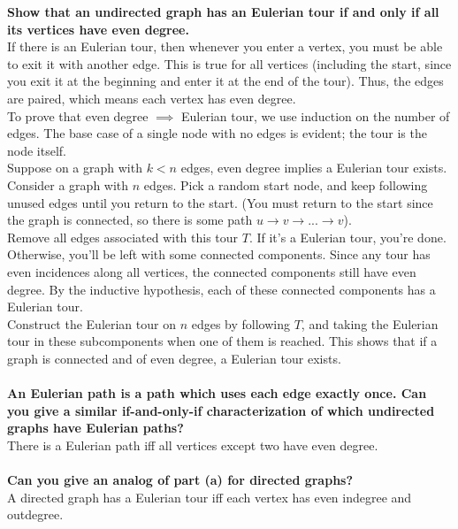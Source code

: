 \begin{problem}{3.26}
    \textbf{Show that an undirected graph has an Eulerian tour if and only if all its vertices have even degree.}
    \\
    If there is an Eulerian tour, then whenever you enter a vertex, you must be able to exit it with another edge. This is true for all vertices (including the start, since you exit it at the beginning and enter it at the end of the tour). Thus, the edges are paired, which means each vertex has even degree.
    \\
    To prove that even degree $\implies$ Eulerian tour, we use induction on the number of edges. The base case of a single node with no edges is evident; the tour is the node itself. 
    \\
    Suppose on a graph with $k < n$ edges, even degree implies a Eulerian tour exists. Consider a graph with $n$ edges. Pick a random start node, and keep following unused edges until you return to the start. (You must return to the start since the graph is connected, so there is some path $u \rightarrow v \rightarrow ... \rightarrow v$).
    \\
    Remove all edges associated with this tour $T$. If it's a Eulerian tour, you're done. Otherwise, you'll be left with some connected components. Since any tour has even incidences along all vertices, the connected components still have even degree. By the inductive hypothesis, each of these connected components has a Eulerian tour.
    \\
    Construct the Eulerian tour on $n$ edges by following $T$, and taking the Eulerian tour in these subcomponents when one of them is reached. This shows that if a graph is connected and of even degree, a Eulerian tour exists.
    \\
    \\
    \textbf{An Eulerian path is a path which uses each edge exactly once. Can you give a similar if-and-only-if characterization of which undirected graphs have Eulerian paths?}
    \\
    There is a Eulerian path iff all vertices except two have even degree.
    \\
    \\
    \textbf{Can you give an analog of part (a) for directed graphs?}
    \\
    A directed graph has a Eulerian tour iff each vertex has even indegree and outdegree.
\end{problem}


